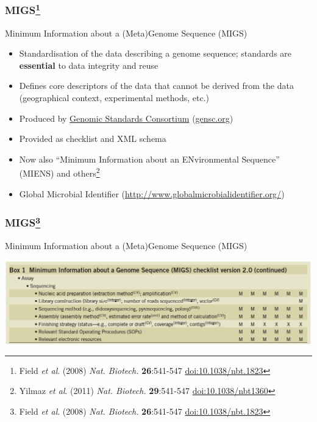 \begin{frame}
  \frametitle{MIGS\footnote{\tiny{Field \textit{et al}. (2008) \textit{Nat. Biotech.} \textbf{26}:541-547 \href{http://dx.doi.org/10.1038/nbt.1823}{doi:10.1038/nbt.1823}}}}
  Minimum Information about a (Meta)Genome Sequence (MIGS) \\
  \begin{itemize}
    \item Standardisation of the data describing a genome sequence; standards are \textbf{essential} to data integrity and reuse
    \item Defines core descriptors of the data that cannot be derived from the data (geographical context, experimental methods, etc.)
    \item Produced by \href{http://en.wikipedia.org/wiki/Genomic_Standards_Consortium}{Genomic Standards Consortium} (\href{http://gensc.org/}{gensc.org})
    \item Provided as checklist and XML schema
    \item Now also ``Minimum Information about an ENvironmental Sequence'' (MIENS) and others\footnote{\tiny{Yilmaz \textit{et al}. (2011) \textit{Nat. Biotech.} \textbf{29}:541-547 \href{http://dx.doi.org/10.1038/nbt1360}{doi:10.1038/nbt1360}}}
    \item Global Microbial Identifier (\href{http://www.globalmicrobialidentifier.org/}{http://www.globalmicrobialidentifier.org/})
  \end{itemize}        
\end{frame}

\begin{frame}
  \frametitle{MIGS\footnote{\tiny{Field \textit{et al}. (2008) \textit{Nat. Biotech.} \textbf{26}:541-547 \href{http://dx.doi.org/10.1038/nbt.1823}{doi:10.1038/nbt.1823}}}}
  Minimum Information about a (Meta)Genome Sequence (MIGS) \\
  \begin{center}
    \includegraphics[width=1\textwidth]{images/migs_table}
  \end{center}           
\end{frame}